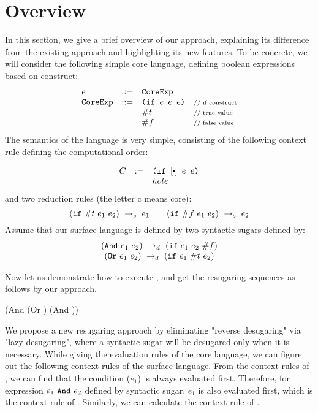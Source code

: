 \section{Overview}
\label{sec2}


In this section, we give a brief overview of our approach, explaining its difference from the existing  approach and highlighting its new features. To be concrete, we will consider the following simple core language, defining boolean expressions based on  construct:
\[
\begin{array}{lllll}
e &::=& \mbox{\tt CoreExp}\\
\mbox{\tt CoreExp} &::=& \texttt{(if~$e$~$e$~$e$)} &\mbox{{\scriptsize // if construct}}\\
& |& \#t  & \mbox{{\scriptsize // true value}}\\
& |& \#f & \mbox{{\scriptsize // false value}}
\end{array}
\]
The semantics of the language is very simple, consisting of the following context rule defining the computational order:

\[
\begin{array}{lcl}
C &:=& \Code{(if $[\bigcdot]$ $e$ $e$)}\\
&&hole\\
\end{array}
\]
and two reduction rules (the letter c means core):
\[
\centering
 \redc{(\m{if}~\true~e_1~e_2)}{e_1}  \qquad \redc{(\m{if}~\false~e_1~e_2)}{e_2} 
\]
Assume that our surface language is defined by two syntactic sugars defined by:
\[
\begin{array}{c}
(\mbox{\tt And}~e_1~e_2) ~\rightarrow_d~ (\mbox{\tt if}~e_1~e_2~\#f)\\
(\mbox{\tt Or}~e_1~e_2) ~\rightarrow_d~ (\mbox{\tt if}~e_1~\#t~e_2)
\end{array}
\]


Now let us demonstrate how to execute , and get the resugaring sequences as follows by our approach.

{\scriptsize
\begin{Codes}
    (And (Or \true \false) (And \false \true))
\end{Codes}
}


We propose a new resugaring approach by eliminating "reverse desugaring" via "lazy desugaring", where a syntactic sugar will be desugared only when it is necessary. While giving the evaluation rules of the core language, we can figure out the following context rules of the surface language. From the context rules of , we can find that the condition ($e_1$) is always evaluated first. Therefore, for expression $e_1~\mbox{\tt And}
~e_2$ defined by syntactic sugar, $e_1$ is also evaluated first, which is the context rule of . Similarly, we can calculate the context rule of .

